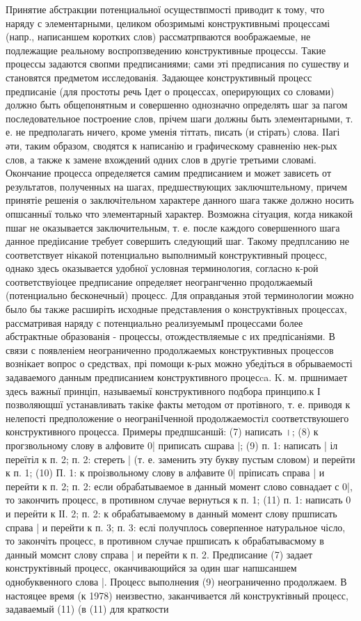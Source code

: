 \documentclass[10pt]{article}
\begin{document}
Принятие абстракции потенциальної осуществпмості приводит к тому, что наряду с элементарными, целиком обозримымі конструктивнымі процессамі (напр., написаншем коротких слов) рассматрпваются воображаемые, не подлежащие реальному воспропзведению конструктивные процессы. Такие процессы задаются свопми предписаниями; сами эті предписания по сушеству и становятся предметом исследованія. Задающее конструктивный процесс предписаніе (для простоты речь Ідет о процессах, оперирующих со словами) должно быть общепонятным и совершенно однозначно определять шаг за пагом последовательное построение слов, прічем шаги должны быть элементарными, т. е. не предполагать ничего, кроме уменія тіттать, писать (и стірать) слова. ІІагі әти, таким образом, сводятся к написанію и графическому сравненію нек-рых слов, а также к замене вхождений одних слов в другіе третьими словамі. Окончание процесса определяется самим предписанием и может зависеть от результатов, полученных на шагах, предшествующих заключштельному, причем принятіе решенія о заключітельном характере данного шага также должно носить опшсанныї только что элементарный характер. Возможна сітуация, когда никакой пшаг не оказывается заключительным, т. е. после каждого совершенного шага данное предіисание требует совершить следующий шаг. Такому предплсанию не соответствует нікакой потенциально выполнимый конструктивный процесс, однако здесь оказывается удобної условная терминология, согласно к-роӥ соответствуіоцее предписание определяет неогрангченно продолжаемый (потенциально бесконечныӥ) процесс. Для оправданыя этой терминологии можно было бы также расширіть исходные представления о конструктівных процессах, рассматривая наряду с потенциально реализуемымІ процессами более абстрактные образованія - процессы, отождествляемые с их предпісаніями. В связи с появленіем неограниченно продолжаемых конструктивных процессов вознікает вопрос о средствах, прі помощи к-рых можно убедіться в обрываемості задаваемого данным предписанием конструктивного процесca. K. м. пршнимает здесь важныї принціп, называемыї конструктивного подбора принципо.к І позволяющшї устанавливать такіке факты методом от протівного, т. е. приводя к нелепості предположение о неограніІченной продолжаемостіл соответствуюшего конструктивного процесса. Примеры предпшсаншй: (7) написать ।; (8) к прогзвольному слову в алфовите 0| приписать сшрава $\mid$; (9) п. 1: написать | іл переїтіл к п. 2; п. 2: стереть | (т. е. заменить эту букву пустым словом) и переӥти к п. 1; (10) П. 1: к проізвольному слову в алфавите 0| пріписать справа | и переӥти к п. 2; п. 2: если обрабатываемое в данный момент слово совнадает с 0|, то закончить процесс, в противном случае вернуться к п. 1; (11) п. 1: написать 0 и переӥти к ІІ. 2; п. 2: к обрабатываемому в данный момент слову пршписать справа | и перейти к п. 3; п. 3: еслі получплось соверпенное натуральное чісло, то закончіть процесс, в противном случае пршписать к обрабатывасмому в данный момснт слову справа | и перейти к п. 2. Предписание (7) задает конструктівный процесс, оканчивающийся за один шаг напшсаншем однобуквенного слова |. Процесс выполнения (9) неограниченно продолжаем. В настояцее время (к 1978) неизвестно, заканчивается лй конструктівный процесс, задаваемый (11) (в (11) для краткости
\end{document}
